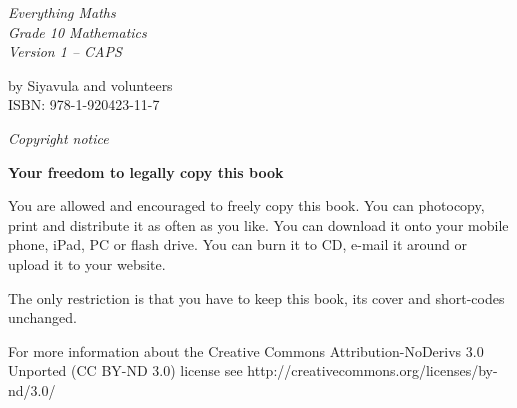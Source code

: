 \newpage
\thispagestyle{empty}
\mbox{}

\newpage
\begin{center}
    \thispagestyle{empty}

    \vspace*{4in}

    {\normalfont\sffamily\fontsize{36}\normalfont\itshape{Everything Maths } \\ \vspace*{1cm}
    {\normalfont\sffamily\fontsize{22}\normalfont\itshape{Grade 10 Mathematics}}
    \vspace*{1in} \\
    \LARGE Version 1 -- CAPS \\

   {\vspace*{2in}
     by Siyavula and volunteers \\

ISBN: 978-1-920423-11-7
  

\vfill

    }}

\end{center}






\newpage
\thispagestyle{empty}
{
\begin{center}
\normalfont\sffamily\fontsize{22}\normalfont\itshape Copyright notice\\

\vspace*{1in}

\textbf{Your freedom to legally copy this book}\\

\end{center}
}

{\LARGE
You are allowed and encouraged to freely copy this book. You can photocopy, print and distribute it as
often as you like. You can download it onto your mobile phone, iPad, PC or flash drive. You can burn it
to CD, e-mail it around or upload it to your website. \par

The only restriction is that you have to keep this book, its cover and short-codes unchanged.\par

For more information about the Creative Commons Attribution-NoDerivs 3.0 Unported (CC BY-ND
3.0) license see http://creativecommons.org/licenses/by-nd/3.0/}\\

